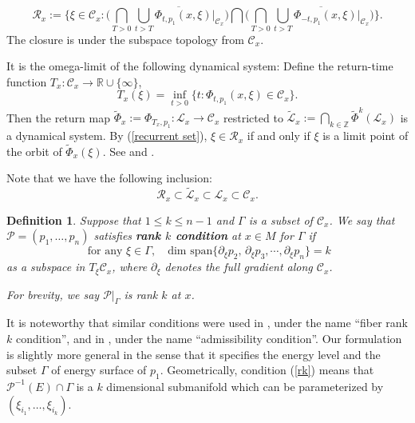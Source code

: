 \documentclass[12pt,reqno]{amsart}
\newcommand{\R}{{\mathbb R}}
\newcommand{\Z}{{\mathbb Z}}
\numberwithin{equation}{section}
\newenvironment{rem}{\medskip\noindent{\it Remark:\/} }{\medskip}
\newtheorem{defn}[theo]{{\sc Definition}}
\begin{document}
\begin{equation}\label{recurrent set}
\mathcal{R}_x:=\{\xi\in \mathcal{C}_x:\Big(\bigcap_{T>0}\overline{\bigcup_{t>T}\Phi_{t,p_1}(x,\xi)|_{\mathcal{C}_x}}\Big)\bigcap\Big(\bigcap_{T>0}\overline{\bigcup_{t>T}\Phi_{-t,p_1}(x,\xi)|_{\mathcal{C}_x}}\Big)\}.
\end{equation}
The closure is under the subspace topology from $\mathcal{C}_x$.

It is the omega-limit of the following dynamical system: Define the return-time function $T_x:\mathcal{C}_x\to \R\cup\{\infty\}$, 
$$
T_x(\xi)=\inf_{t>0}\{t:\Phi_{t,p_1}(x,\xi)\in \mathcal{C}_x\}.
$$
Then the return map $\widetilde\Phi_x:=\Phi_{T_x,p_1}:\mathcal{L}_x\to \mathcal{C}_x$ restricted to $\widetilde{\mathcal{L}}_x:=\bigcap_{k\in \Z}\widetilde{\Phi}^k(\mathcal{L}_x)$ is a dynamical system. By (\ref{recurrent set}), $\xi\in \mathcal{R}_x$ if and only if $\xi$ is a limit point of the orbit of $\widetilde\Phi_x(\xi)$. See \cite{STZ11} and \cite{Gal19}.

Note that we have the following inclusion:
$$
\mathcal{R}_x\subset\widetilde{\mathcal{L}}_x\subset\mathcal{L}_x\subset \mathcal{C}_x.
$$

\begin{defn}\label{def}
Suppose that $1\leq k\leq n-1$ and $\Gamma$ is a subset of $\mathcal{C}_x$. We say that $\mathcal{P}=(p_1, \dots, p_n)$ satisfies {\bf rank $k$ condition} at $x\in M$ for $\Gamma$ if
\begin{equation}\label{rk}
    \text{ for any } \xi\in\Gamma,\quad\text{dim span}\{\partial_\xi p_2 ,\,\partial_\xi p_3,\cdots, \partial_\xi p_n\} = k
\end{equation}
as a subspace in $T_{\xi}\mathcal{C}_x$, where $\partial_{\xi}$ denotes the full gradient along $\mathcal{C}_x$.

For brevity, we say $\mathcal{P}|_{\Gamma}$ is rank $k$ at $x$.
\end{defn}

\begin{rem}
    It is noteworthy that similar conditions were used in \cite[Def. 1.2]{EGK24}, under the name “fiber rank $k$ condition”, and in \cite[Thm 0.1 (2)]{Tacy19}, under the name “admissibility condition”. Our formulation is slightly more general in the sense that it specifies the energy level and the subset $\Gamma$ of energy surface of $p_1$. Geometrically, condition (\ref{rk}) means that $\mathcal{P}^{-1}(E)\cap \Gamma$ is a $k$ dimensional submanifold which can be parameterized by $(\xi_{i_1},\dots, \xi_{i_k})$.
\end{rem}
\end{document}
